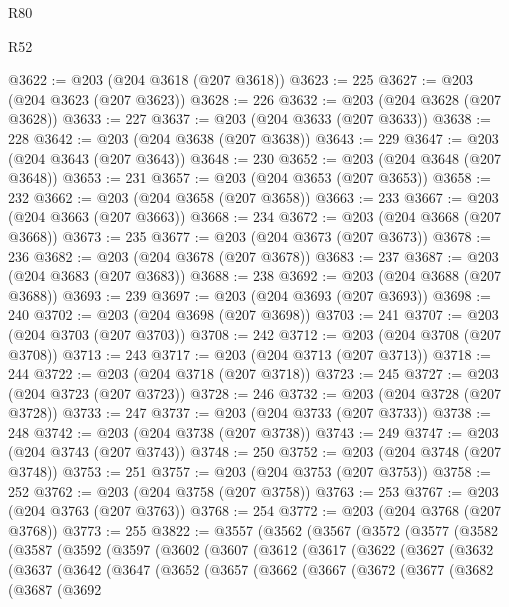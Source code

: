 \begin{lexlean}{R80}
\begin{lexlean}{R52}
\begin{coremodule}
{{{{{{{{{{{{{{{{{{{{{{{{{{{{{{{{{{{{{{{{{{{{{{{{{{{{{{{{{{{{{{{{{{{{{{{{{{{{{{{{{{{{{{{{{{{{{{{{{{{{{{{{{{{{{{{{{{{{{{{{{{{{{{{{{{{{{{{{{{{{{{{{{{{{{{{{{{{{{{{{{{{{{{{{{{{{{{{{{{{{{{{{{{{{{{{{{{{{{{@3622 := @203 (@204 @3618 (@207 @3618))
@3623 := 225
@3627 := @203 (@204 @3623 (@207 @3623))
@3628 := 226
@3632 := @203 (@204 @3628 (@207 @3628))
@3633 := 227
@3637 := @203 (@204 @3633 (@207 @3633))
@3638 := 228
@3642 := @203 (@204 @3638 (@207 @3638))
@3643 := 229
@3647 := @203 (@204 @3643 (@207 @3643))
@3648 := 230
@3652 := @203 (@204 @3648 (@207 @3648))
@3653 := 231
@3657 := @203 (@204 @3653 (@207 @3653))
@3658 := 232
@3662 := @203 (@204 @3658 (@207 @3658))
@3663 := 233
@3667 := @203 (@204 @3663 (@207 @3663))
@3668 := 234
@3672 := @203 (@204 @3668 (@207 @3668))
@3673 := 235
@3677 := @203 (@204 @3673 (@207 @3673))
@3678 := 236
@3682 := @203 (@204 @3678 (@207 @3678))
@3683 := 237
@3687 := @203 (@204 @3683 (@207 @3683))
@3688 := 238
@3692 := @203 (@204 @3688 (@207 @3688))
@3693 := 239
@3697 := @203 (@204 @3693 (@207 @3693))
@3698 := 240
@3702 := @203 (@204 @3698 (@207 @3698))
@3703 := 241
@3707 := @203 (@204 @3703 (@207 @3703))
@3708 := 242
@3712 := @203 (@204 @3708 (@207 @3708))
@3713 := 243
@3717 := @203 (@204 @3713 (@207 @3713))
@3718 := 244
@3722 := @203 (@204 @3718 (@207 @3718))
@3723 := 245
@3727 := @203 (@204 @3723 (@207 @3723))
@3728 := 246
@3732 := @203 (@204 @3728 (@207 @3728))
@3733 := 247
@3737 := @203 (@204 @3733 (@207 @3733))
@3738 := 248
@3742 := @203 (@204 @3738 (@207 @3738))
@3743 := 249
@3747 := @203 (@204 @3743 (@207 @3743))
@3748 := 250
@3752 := @203 (@204 @3748 (@207 @3748))
@3753 := 251
@3757 := @203 (@204 @3753 (@207 @3753))
@3758 := 252
@3762 := @203 (@204 @3758 (@207 @3758))
@3763 := 253
@3767 := @203 (@204 @3763 (@207 @3763))
@3768 := 254
@3772 := @203 (@204 @3768 (@207 @3768))
@3773 := 255
@3822 := @3557
    (@3562
      (@3567
        (@3572
          (@3577
            (@3582
              (@3587
                (@3592
                  (@3597
                    (@3602
                      (@3607
                        (@3612
                          (@3617
                            (@3622
                              (@3627
                                (@3632
                                  (@3637
                                    (@3642
                                      (@3647
                                        (@3652
                                          (@3657
                                            (@3662
                                              (@3667
                                                (@3672
                                                  (@3677
                                                    (@3682
                                                      (@3687
                                                        (@3692
}}}}}}}}}}}}}}}}}}}}}}}}}}}}}}}}}}}}}}}}}}}}}}}}}}}}}}}}}}}}}}}}}}}}}}}}}}}}}}}}}}}}}}}}}}}}}}}}}}}}}}}}}}}}}}}}}}}}}}}}}}}}}}}}}}}}}}}}}}}}}}}}}}}}}}}}}}}}}}}}}}}}}}}}}}}}}}}}}}}}}}}}}}}}}}}}}}}}}}
\end{coremodule}
\end{lexlean}
\end{lexlean}
